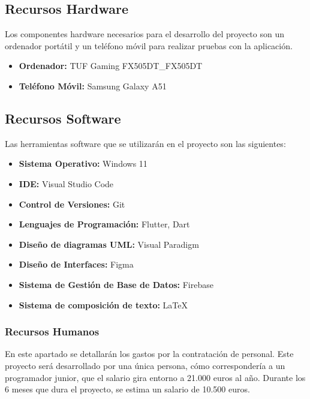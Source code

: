 \subsection{Recursos Hardware}
Los componentes hardware necesarios para el desarrollo del proyecto son un ordenador portátil y un teléfono móvil para realizar pruebas con la aplicación. 

\begin{itemize}
    \item \textbf{Ordenador:} TUF Gaming FX505DT\_FX505DT 
    \item \textbf{Teléfono Móvil:} Samsung Galaxy A51
\end{itemize}

\subsection{Recursos Software}
Las herramientas software que se utilizarán en el proyecto son las siguientes:
\begin{itemize}
    \item \textbf{Sistema Operativo:} Windows 11
    \item \textbf{IDE:} Visual Studio Code
    \item \textbf{Control de Versiones:} Git
    \item \textbf{Lenguajes de Programación:} Flutter, Dart
    \item \textbf{Diseño de diagramas UML:} Visual Paradigm
    \item \textbf{Diseño de Interfaces:} Figma
    \item \textbf{Sistema de Gestión de Base de Datos:} Firebase
    \item \textbf{Sistema de composición de texto:} LaTeX
\end{itemize}

\subsubsection{Recursos Humanos}
En este apartado se detallarán los gastos por la contratación de personal. Este proyecto será desarrollado por una única persona, cómo correspondería a un programador junior, que el salario gira entorno a 21.000 euros al año. Durante los 6 meses que dura el proyecto, 
se estima un salario de 10.500 euros.


